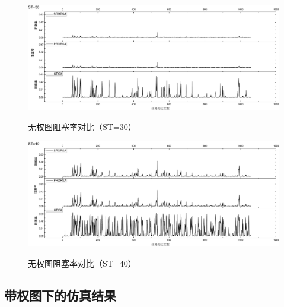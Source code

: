\begin{figure}
\setlength{\belowcaptionskip}{-0.5cm}
\begin{center}
{\includegraphics[width=1 \textwidth]{figures/B30Z.pdf}}
\end{center}
\caption{{\footnotesize{无权图阻塞率对比（ST=30）}}}
\label{B30Z}
\end{figure}
\begin{figure}
\setlength{\belowcaptionskip}{-0.5cm}
\begin{center}
{\includegraphics[width=1 \textwidth]{figures/B40Z.pdf}}
\end{center}
\caption{{\footnotesize{无权图阻塞率对比（ST=40）}}}
\label{B40Z}
\end{figure}
\subsection{带权图下的仿真结果}
